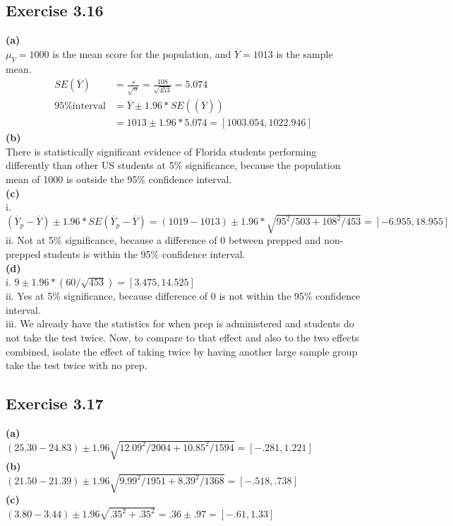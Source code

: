 \documentclass[fleqn]{article}
\begin{document}
\begin{adjustwidth}{-2cm}{-2cm}
\subsection{Exercise 3.16}
\textbf{(a)}\\
$\mu_{Y} = 1000$ is the mean score for the population, and $\overline{Y} = 1013$ is the sample mean.
\begin{align*}
SE\left(\overline{Y}\right) &= \frac{s}{\sqrt{n}} = \frac{108}{\sqrt{453}} = 5.074\\
\text{95\% interval} &= \overline{Y} \pm 1.96*SE\left(\left(\overline{Y}\right)\right)\\
&= 1013 \pm 1.96*5.074 = [1003.054, 1022.946]
\end{align*}
\textbf{(b)}\\
There is statistically significant evidence of Florida students performing differently than other US students at 5\% significance, because the population mean of 1000 is outside the 95\% confidence interval.\\
\textbf{(c)}\\
\null\quad i. $(\overline{Y}_{p}-\overline{Y}) \pm 1.96*SE(\overline{Y}_{p}-\overline{Y}) = (1019-1013) \pm 1.96*\sqrt{95^{2}/503 + 108^{2}/453} = [-6.955, 18.955]$\\
\null\quad ii. Not at 5\% significance, because a difference of 0 between prepped and non-prepped students is within the 95\% confidence interval.\\
\textbf{(d)}\\
\null\quad i. $9 \pm 1.96*(60/\sqrt{453}) = [3.475, 14.525]$\\
\null\quad ii. Yes at 5\% significance, because difference of 0 is not within the 95\% confidence interval.\\
\null\quad iii. We already have the statistics for when prep is administered and students do not take the test twice. \null\quad\null\quad Now, to compare to that effect and also to the two effects combined, isolate the effect of taking twice \null\quad\null\quad by having another large sample group take the test twice with no prep.

\subsection{Exercise 3.17}
\textbf{(a)}\\
$(25.30-24.83) \pm 1.96\sqrt{12.09^{2}/2004 + 10.85^{2}/1594} = [-.281, 1.221]$\\
\textbf{(b)}\\
$(21.50-21.39) \pm 1.96\sqrt{9.99^{2}/1951 + 8.39^{2}/1368} = [-.518, .738]$\\
\textbf{(c)}\\
$(3.80-3.44) \pm 1.96\sqrt{.35^{2} + .35^{2}} = .36 \pm .97 = [-.61, 1.33]$


\end{adjustwidth}
\end{document}
